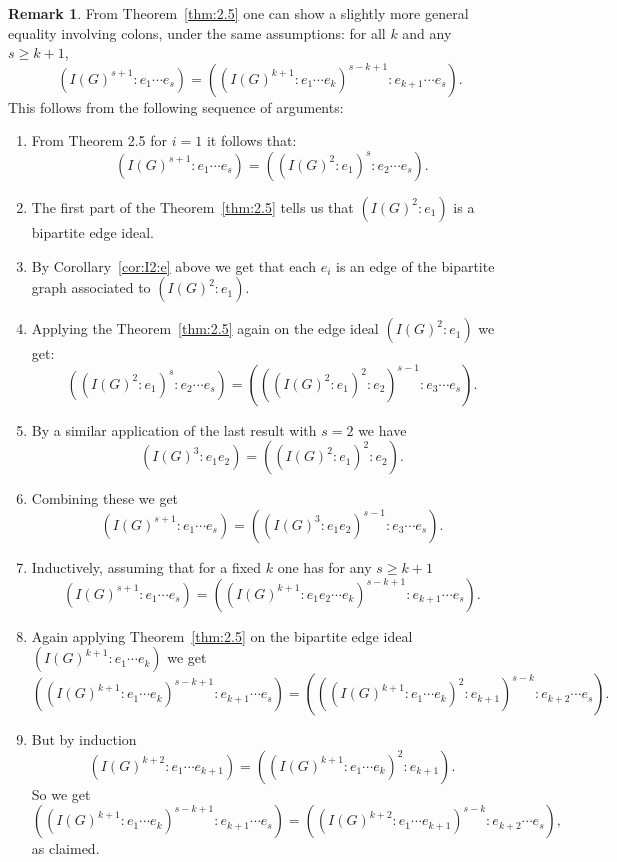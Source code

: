\documentclass[10pt]{article}
\theoremstyle{definition}
\newtheorem{rema}[theorem]{Remark}
\numberwithin{equation}{section}
\begin{document}
\begin{rema} From Theorem~\ref{thm:2.5} one can show a slightly more general equality  involving colons, under the same assumptions: for all $k$ and any $s \geq k+1$,
\begin{equation*}
(I(G)^{s+1}:e_1\cdots e_s)=((I(G)^{k+1}:e_1 \cdots e_k)^{s-k+1} : e_{k+1} \cdots e_s).
\end{equation*}
This follows from the following sequence of arguments:
\begin{enumerate}[align=parleft,left=0pt,label=(\alph*)]
\item From Theorem 2.5 for $i=1$ it follows that:
\begin{equation*}
  (I(G)^{s+1}:e_1\cdots e_s)=((I(G)^2:e_1)^s : e_2 \cdots e_s ).
\end{equation*}

 \item The first part of the Theorem~\ref{thm:2.5} tells us that $(I(G)^2:e_1)$ is a bipartite edge ideal. 
  \item By Corollary~\ref{cor:I2:e} above we get that each $e_i$ is an edge of the bipartite graph associated to $(I(G)^2:e_1)$.
  \item Applying the Theorem~\ref{thm:2.5} again on the edge ideal $(I(G)^2:e_1)$ we get:
 \begin{equation*}
 ((I(G)^2:e_1)^s : e_2 \cdots e_s )=(((I(G)^2:e_1)^2:e_2)^{s-1} : e_3 \cdots e_s).
 \end{equation*}
\item By a similar application of the last result with $s=2$ we have
  \begin{equation*}
  (I(G)^3:e_1e_2)=((I(G)^2:e_1)^2:e_2).
  \end{equation*}

\item Combining these we get
\begin{equation*}
 (I(G)^{s+1}:e_1\cdots e_s)=((I(G)^3:e_1e_2)^{s-1} : e_3 \cdots e_s).
 \end{equation*}

\item Inductively, assuming that for a fixed $k$ one has for any $s \geq k+1$
\begin{equation*}
(I(G)^{s+1}:e_1\cdots e_s)=((I(G)^{k+1}:e_1e_2 \cdots e_k)^{s-k+1} : e_{k+1} \cdots e_s).
\end{equation*}
\item Again applying Theorem~\ref{thm:2.5} on the bipartite edge ideal $(I(G)^{k+1}:e_1 \cdots e_k)$ we get
 \begin{equation*}
 ((I(G)^{k+1} :e_1 \cdots e_k)^{s-k+1} :e_{k+1} \cdots e_s)=( ((I(G)^{k+1}: e_1 \cdots e_k )^2:e_{k+1})^{s-k} : e_{k+2} \cdots e_s).
\end{equation*}
\item But by induction $$(I(G)^{k+2}:e_1 \cdots e_{k+1})=((I(G)^{k+1}: e_1 \cdots e_k )^2:e_{k+1}).$$
  So we get $$((I(G)^{k+1} :e_1 \cdots e_k)^{s-k+1} :e_{k+1} \cdots e_s)= ((I(G)^{k+2}:e_1 \cdots e_{k+1})^{s-k}:e_{k+2} \cdots e_s),$$ as claimed.
\end{enumerate}
\end{rema}
\end{document}
